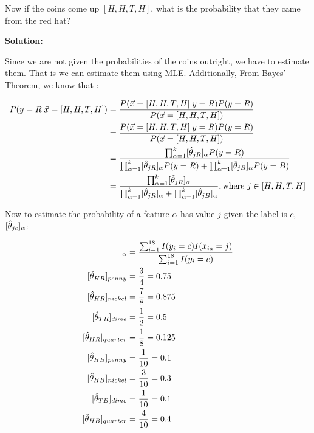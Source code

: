 \documentclass[a4paper]{article}
\begin{document}

Now if the coins come up $[H,H,T,H]$, what is the probability that they came from the red hat?


\textbf{Solution:} 

Since we are not given the probabilities of the coins outright, we have to estimate them. That is we can estimate them using MLE. Additionally, From Bayes' Theorem, we know that :


\begin{align*}
    P(y = R|\vec{x} = [H,H,T,H]) &= \frac{P(\vec{x} = [H,H,T,H] | y = R) P(y=R)}{P(\vec{x} = [H,H,T,H])} \\
     &= \frac{P(\vec{x} = [H,H,T,H] | y = R) P(y=R)}{P(\vec{x} = [H,H,T,H])} \\
    &= \frac{\prod_{\alpha = 1}^{k}[\Hat{\theta}_{jR}]_{\alpha}P(y = R)}{\prod_{\alpha = 1}^{k}[\Hat{\theta}_{jR}]_{\alpha}P(y=R) + \prod_{\alpha = 1}^{k}[\Hat{\theta}_{jB}]_{\alpha}P(y=B)} \\
    &= \frac{\prod_{\alpha = 1}^{k}[\Hat{\theta}_{jR}]_{\alpha}}{\prod_{\alpha = 1}^{k}[\Hat{\theta}_{jR}]_{\alpha} + \prod_{\alpha = 1}^{k}[\Hat{\theta}_{jB}]_{\alpha}}, \text{where $j \in [H,H,T,H]$}
\end{align*}

Now to estimate the probability of a feature $\alpha$ has value $j$ given the label is $c$, $[\Hat{\theta}_{jc}]_{\alpha}$:

\begin{align*}
[\Hat{\theta}_{jc}]_{\alpha} &= \frac{\sum_{i = 1}^{18}I(y_i = c)I(x_{ia} = j)}{\sum_{i=1}^{18}I(y_i = c)} \\
[\Hat{\theta}_{HR}]_{penny} &= \frac{3}{4} = 0.75 \\
[\Hat{\theta}_{HR}]_{nickel} &= \frac{7}{8} = 0.875 \\
[\Hat{\theta}_{TR}]_{dime} &= \frac{1}{2} = 0.5 \\
[\Hat{\theta}_{HR}]_{quarter} &= \frac{1}{8} = 0.125 \\
[\Hat{\theta}_{HB}]_{penny} &= \frac{1}{10} = 0.1 \\
[\Hat{\theta}_{HB}]_{nickel} &= \frac{3}{10} = 0.3 \\
[\Hat{\theta}_{TB}]_{dime} &= \frac{1}{10} = 0.1 \\
[\Hat{\theta}_{HB}]_{quarter} &= \frac{4}{10} = 0.4
\end{align*}
\end{document}
